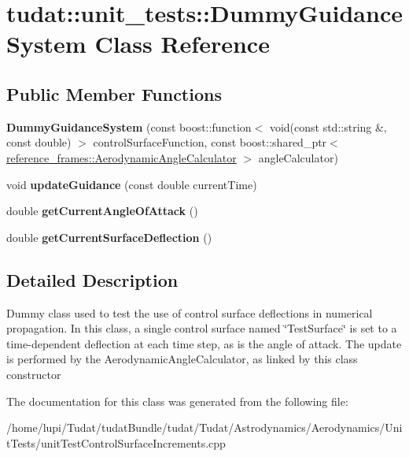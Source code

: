 \hypertarget{classtudat_1_1unit__tests_1_1DummyGuidanceSystem}{}\section{tudat\+:\+:unit\+\_\+tests\+:\+:Dummy\+Guidance\+System Class Reference}
\label{classtudat_1_1unit__tests_1_1DummyGuidanceSystem}
\subsection*{Public Member Functions}
\begin{DoxyCompactItemize}
\item 
{\bfseries Dummy\+Guidance\+System} (const boost\+::function$<$ void(const std\+::string \&, const double) $>$ control\+Surface\+Function, const boost\+::shared\+\_\+ptr$<$ \hyperlink{classtudat_1_1reference__frames_1_1AerodynamicAngleCalculator}{reference\+\_\+frames\+::\+Aerodynamic\+Angle\+Calculator} $>$ angle\+Calculator)\hypertarget{classtudat_1_1unit__tests_1_1DummyGuidanceSystem_a61ffacf56005ba92e891bf0097f73c9c}{}\label{classtudat_1_1unit__tests_1_1DummyGuidanceSystem_a61ffacf56005ba92e891bf0097f73c9c}

\item 
void {\bfseries update\+Guidance} (const double current\+Time)\hypertarget{classtudat_1_1unit__tests_1_1DummyGuidanceSystem_a34863236dd43131e9bbdd95a83f9809f}{}\label{classtudat_1_1unit__tests_1_1DummyGuidanceSystem_a34863236dd43131e9bbdd95a83f9809f}

\item 
double {\bfseries get\+Current\+Angle\+Of\+Attack} ()\hypertarget{classtudat_1_1unit__tests_1_1DummyGuidanceSystem_aa2003ac5a027deba24d99a7765a0127b}{}\label{classtudat_1_1unit__tests_1_1DummyGuidanceSystem_aa2003ac5a027deba24d99a7765a0127b}

\item 
double {\bfseries get\+Current\+Surface\+Deflection} ()\hypertarget{classtudat_1_1unit__tests_1_1DummyGuidanceSystem_a7c7d364882680f01cf46f8b6f6694b82}{}\label{classtudat_1_1unit__tests_1_1DummyGuidanceSystem_a7c7d364882680f01cf46f8b6f6694b82}

\end{DoxyCompactItemize}


\subsection{Detailed Description}
Dummy class used to test the use of control surface deflections in numerical propagation. In this class, a single control surface named \char`\"{}\+Test\+Surface\char`\"{} is set to a time-\/dependent deflection at each time step, as is the angle of attack. The update is performed by the Aerodynamic\+Angle\+Calculator, as linked by this class\textquotesingle{} constructor 

The documentation for this class was generated from the following file\+:\begin{DoxyCompactItemize}
\item 
/home/lupi/\+Tudat/tudat\+Bundle/tudat/\+Tudat/\+Astrodynamics/\+Aerodynamics/\+Unit\+Tests/unit\+Test\+Control\+Surface\+Increments.\+cpp\end{DoxyCompactItemize}

